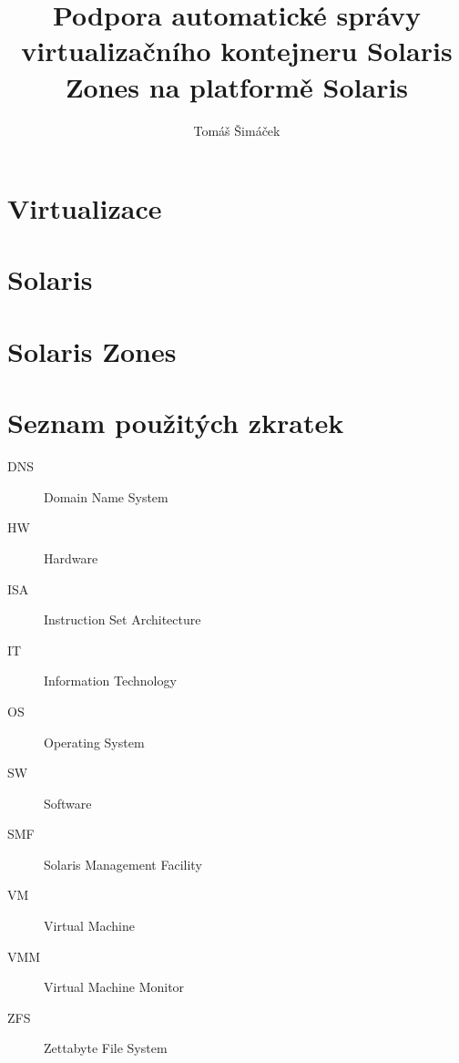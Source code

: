 \documentclass[thesis=M,czech]{FITthesis}[2012/06/26]
\title{Podpora automatické správy virtualizačního kontejneru Solaris Zones na platformě Solaris}
\author{Tomáš Šimáček} %
\begin{document}

\begin{introduction}
  
\end{introduction}

\chapter{Virtualizace}
  
  
\chapter{Solaris}
  

\chapter{Solaris Zones}
  

\begin{conclusion}
  
\end{conclusion}




\appendix

\chapter{Seznam použitých zkratek}
\begin{description}
        \item[DNS] Domain Name System
        \item[HW]  Hardware
        \item[ISA]  Instruction Set Architecture
	\item[IT]  Information Technology
	\item[OS]  Operating System
	\item[SW]  Software
	\item[SMF] Solaris Management Facility
	\item[VM]  Virtual Machine
	\item[VMM] Virtual Machine Monitor
	\item[ZFS] Zettabyte File System
\end{description}
\end{document}
